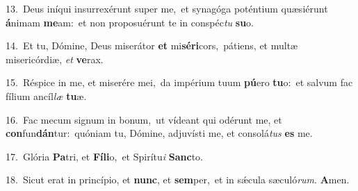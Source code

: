 {\numbfont\textcolor{\numbcolor}{13.}}~Deus iníqui insurrexérunt super me,~\dagger et synagóga poténtium quæsiérunt \textbf{á}\-nimam \textbf{me}\-am:~\star et non proposuérunt te in conspéc\textit{tu} \textbf{su}\-o.\par
{\numbfont\textcolor{\numbcolor}{14.}}~Et tu, Dómine, Deus miserátor \textbf{et} mi\-\textbf{sé}\-\textbf{ri}cors,~\star pátiens, et multæ misericórdiæ, \textit{et} \textbf{ve}\-rax.\par
{\numbfont\textcolor{\numbcolor}{15.}}~Réspice in me, et miserére mei,~\dagger da impérium tuum \textbf{pú}\-ero \textbf{tu}\-o:~\star et salvum fac fílium ancíl\textit{læ} \textbf{tu}\-æ.\par
{\numbfont\textcolor{\numbcolor}{16.}}~Fac mecum signum in bonum,~\dagger ut vídeant qui odérunt me, et \textbf{con}\-fun\-\textbf{dán}\-tur:~\star quóniam tu, Dómine, adjuvísti me, et consolá\textit{tus} \textbf{es} me.\par
{\numbfont\textcolor{\numbcolor}{17.}}~Glória \textbf{Pa}\-tri, et \textbf{Fí}\-\textbf{li}o,~\star et Spirítu\textit{i} \textbf{Sanc}\-to.\par
{\numbfont\textcolor{\numbcolor}{18.}}~Sicut erat in princípio, et \textbf{nunc}\-, et \textbf{sem}\-per,~\star et in sǽcula sæculó\-\textit{rum}\-. \textbf{A}\-men.\par
